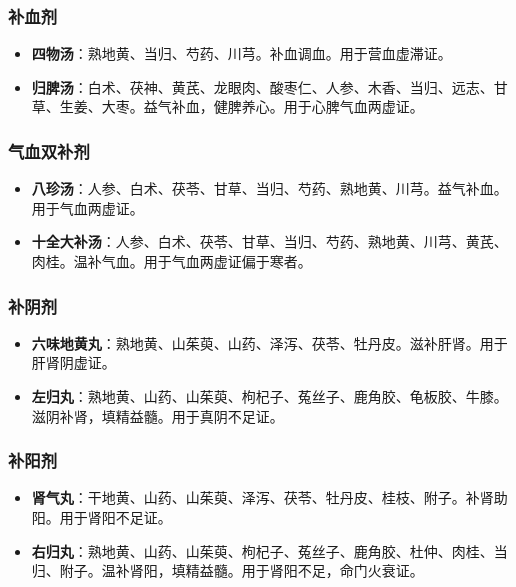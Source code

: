 \documentclass[12pt,UTF8]{ctexbook}
\begin{document}
\subsubsection{补血剂}

\begin{itemize}
\item \textbf{四物汤}：熟地黄、当归、芍药、川芎。补血调血。用于营血虚滞证。
\item \textbf{归脾汤}：白术、茯神、黄芪、龙眼肉、酸枣仁、人参、木香、当归、远志、甘草、生姜、大枣。益气补血，健脾养心。用于心脾气血两虚证。
\end{itemize}

\subsubsection{气血双补剂}

\begin{itemize}
\item \textbf{八珍汤}：人参、白术、茯苓、甘草、当归、芍药、熟地黄、川芎。益气补血。用于气血两虚证。
\item \textbf{十全大补汤}：人参、白术、茯苓、甘草、当归、芍药、熟地黄、川芎、黄芪、肉桂。温补气血。用于气血两虚证偏于寒者。
\end{itemize}

\subsubsection{补阴剂}

\begin{itemize}
\item \textbf{六味地黄丸}：熟地黄、山茱萸、山药、泽泻、茯苓、牡丹皮。滋补肝肾。用于肝肾阴虚证。
\item \textbf{左归丸}：熟地黄、山药、山茱萸、枸杞子、菟丝子、鹿角胶、龟板胶、牛膝。滋阴补肾，填精益髓。用于真阴不足证。
\end{itemize}

\subsubsection{补阳剂}

\begin{itemize}
\item \textbf{肾气丸}：干地黄、山药、山茱萸、泽泻、茯苓、牡丹皮、桂枝、附子。补肾助阳。用于肾阳不足证。
\item \textbf{右归丸}：熟地黄、山药、山茱萸、枸杞子、菟丝子、鹿角胶、杜仲、肉桂、当归、附子。温补肾阳，填精益髓。用于肾阳不足，命门火衰证。
\end{itemize}
\end{document}
